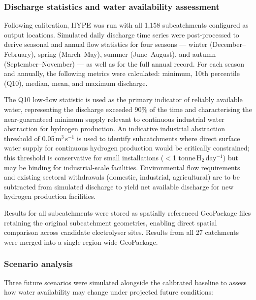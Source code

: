 \documentclass[draft]{agujournal2019}
\begin{document}
\subsubsection{Discharge statistics and water availability assessment}
Following calibration, HYPE was run with all 1,158 subcatchments configured as output locations. Simulated daily discharge time series were post-processed to derive seasonal and annual flow statistics for four seasons — winter (December–February), spring (March–May), summer (June–August), and autumn (September–November) — as well as for the full annual record. For each season and annually, the following metrics were calculated: minimum, 10th percentile (Q10), median, mean, and maximum discharge.

The Q10 low-flow statistic is used as the primary indicator of reliably available water, representing the discharge exceeded 90\% of the time and characterising the near-guaranteed minimum supply relevant to continuous industrial water abstraction for hydrogen production. An indicative industrial abstraction threshold of 0.05\,m$^3$\,s$^{-1}$ is used to identify subcatchments where direct surface water supply for continuous hydrogen production would be critically constrained; this threshold is conservative for small installations ($<$1 tonne\,H$_2$\,day$^{-1}$) but may be binding for industrial-scale facilities. Environmental flow requirements and existing sectoral withdrawals (domestic, industrial, agricultural) are to be subtracted from simulated discharge to yield net available discharge for new hydrogen production facilities.

Results for all subcatchments were stored as spatially referenced GeoPackage files retaining the original subcatchment geometries, enabling direct spatial comparison across candidate electrolyser sites. Results from all 27 catchments were merged into a single region-wide GeoPackage.

\subsubsection{Scenario analysis}
Three future scenarios were simulated alongside the calibrated baseline to assess how water availability may change under projected future conditions:
\end{document}
